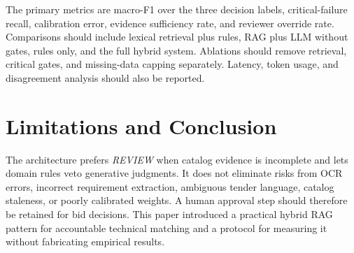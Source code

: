 \documentclass[conference]{IEEEtran}
\begin{document}
The primary metrics are macro-F1 over the three decision labels, critical-failure recall, calibration error, evidence sufficiency rate, and reviewer override rate. Comparisons should include lexical retrieval plus rules, RAG plus LLM without gates, rules only, and the full hybrid system. Ablations should remove retrieval, critical gates, and missing-data capping separately. Latency, token usage, and disagreement analysis should also be reported.

\section{Limitations and Conclusion}
The architecture prefers \emph{REVIEW} when catalog evidence is incomplete and lets domain rules veto generative judgments. It does not eliminate risks from OCR errors, incorrect requirement extraction, ambiguous tender language, catalog staleness, or poorly calibrated weights. A human approval step should therefore be retained for bid decisions. This paper introduced a practical hybrid RAG pattern for accountable technical matching and a protocol for measuring it without fabricating empirical results.



\end{document}
